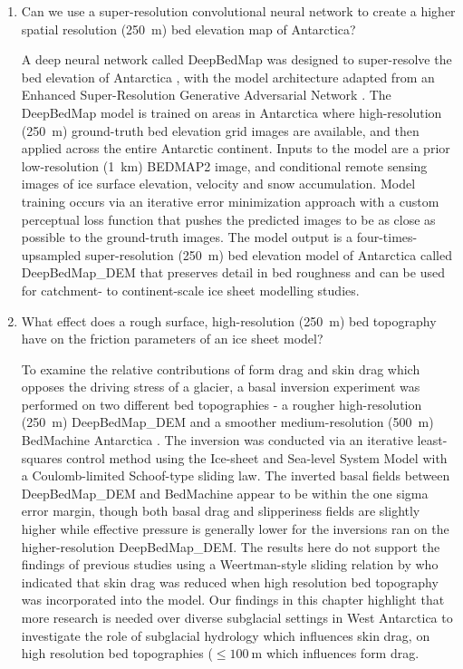 \begin{enumerate}
  \item Can we use a super-resolution convolutional neural network to create a higher spatial resolution (\SI{250}{\metre}) bed elevation map of Antarctica?

  A deep neural network called DeepBedMap was designed to super-resolve the bed elevation of Antarctica \citep{LeongDeepBedMapdeepneural2020}, with the model architecture adapted from an Enhanced Super-Resolution Generative Adversarial Network \citep{WangESRGANEnhancedSuperResolution2019}.
  The DeepBedMap model is trained on areas in Antarctica where high-resolution (\SI{250}{\metre}) ground-truth bed elevation grid images are available, and then applied across the entire Antarctic continent.
  Inputs to the model are a prior low-resolution (\SI{1}{\kilo\metre}) BEDMAP2 image, and conditional remote sensing images of ice surface elevation, velocity and snow accumulation.
  Model training occurs via an iterative error minimization approach with a custom perceptual loss function that pushes the predicted images to be as close as possible to the ground-truth images.
  The model output is a four-times-upsampled super-resolution (\SI{250}{\metre}) bed elevation model of Antarctica called DeepBedMap\_DEM that preserves detail in bed roughness and can be used for catchment- to continent-scale ice sheet modelling studies.

  \item What effect does a rough surface, high-resolution (\SI{250}{\metre}) bed topography have on the friction parameters of an ice sheet model?

  To examine the relative contributions of form drag and skin drag which opposes the driving stress of a glacier, a basal inversion experiment was performed on two different bed topographies - a rougher high-resolution (\SI{250}{\metre}) DeepBedMap\_DEM \citep{LeongDeepBedMapdeepneural2020} and a smoother medium-resolution (\SI{500}{\metre}) BedMachine Antarctica \citep{MorlighemDeepglacialtroughs2019}.
  The inversion was conducted via an iterative least-squares control method using the Ice-sheet and Sea-level System Model \citep{LarourContinentalscalehigh2012} with a Coulomb-limited Schoof-type sliding law.
  The inverted basal fields between DeepBedMap\_DEM and BedMachine appear to be within the one sigma error margin, though both basal drag and slipperiness fields are slightly higher while effective pressure is generally lower for the inversions ran on the higher-resolution DeepBedMap\_DEM.
  The results here do not support the findings of previous studies using a Weertman-style sliding relation by \citet{Kyrke-SmithRelevanceDetailBasal2018} who indicated that skin drag was reduced when high resolution bed topography was incorporated into the model.
  Our findings in this chapter highlight that more research is needed over diverse subglacial settings in West Antarctica to investigate the role of subglacial hydrology which influences skin drag, on high resolution bed topographies ($\leq\SI{100}{\metre}$ which influences form drag.


\end{enumerate}
